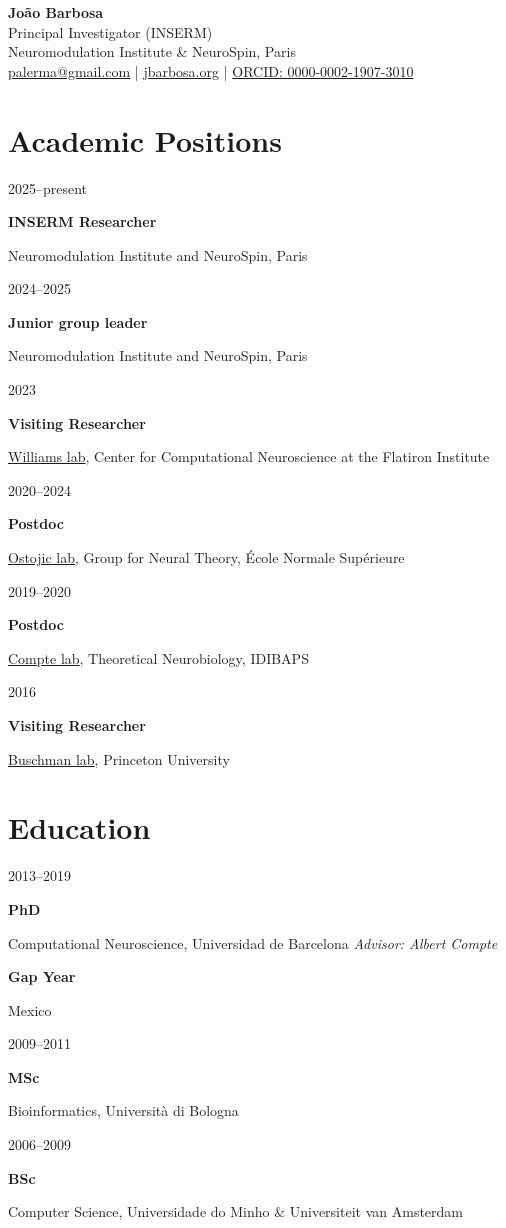 \documentclass[11pt,a4paper]{article}
\newcommand{\cventry}[4]{
\noindent
\begin{minipage}[t]{0.15\textwidth}
\raggedright #1
\end{minipage}%
\begin{minipage}[t]{0.15\textwidth}
\raggedright \textbf{#2}
\end{minipage}%
\begin{minipage}[t]{0.7\textwidth}
\raggedright #3 \textit{#4}
\end{minipage}
\vspace{3pt}
}
\begin{document}
\begin{center}
{\LARGE \textbf{João Barbosa}}\\
\vspace{6pt}
Principal Investigator (INSERM)\\
Neuromodulation Institute \& NeuroSpin, Paris\\
\vspace{4pt}
\href{mailto:palerma@gmail.com}{palerma@gmail.com} | \href{https://jbarbosa.org}{jbarbosa.org} | \href{https://orcid.org/0000-0002-1907-3010}{ORCID: 0000-0002-1907-3010}
\end{center}

\vspace{12pt}

\section{Academic Positions}

\cventry{2025--present}{INSERM Researcher}{Neuromodulation Institute and NeuroSpin, Paris}{}

\cventry{2024--2025}{Junior group leader}{Neuromodulation Institute and NeuroSpin, Paris}{}

\cventry{2023}{Visiting Researcher}{\href{http://neurostatslab.org/}{Williams lab}, Center for Computational Neuroscience at the Flatiron Institute}{}

\cventry{2020--2024}{Postdoc}{\href{https://lnc2.dec.ens.fr/en/member/655/srdjan-ostojic}{Ostojic lab}, Group for Neural Theory, École Normale Supérieure}{}

\cventry{2019--2020}{Postdoc}{\href{https://braincircuitsbehavior.org/people}{Compte lab}, Theoretical Neurobiology, IDIBAPS}{}

\cventry{2016}{Visiting Researcher}{\href{https://www.timbuschman.com/}{Buschman lab}, Princeton University}{}

\section{Education}

\cventry{2013--2019}{PhD}{Computational Neuroscience, Universidad de Barcelona}{Advisor: Albert Compte}

\cventry{}{Gap Year}{Mexico}{}

\cventry{2009--2011}{MSc}{Bioinformatics, Università di Bologna}{}

\cventry{2006--2009}{BSc}{Computer Science, Universidade do Minho \& Universiteit van Amsterdam}{}
\end{document}
